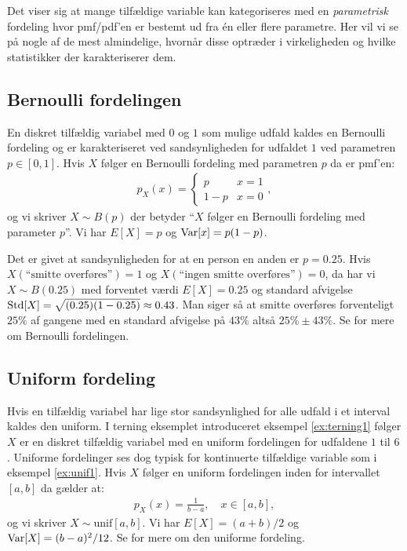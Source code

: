 Det viser sig at mange tilfældige variable kan kategoriseres med en \emph{parametrisk} fordeling hvor pmf/pdf'en er bestemt ud fra én eller flere parametre. Her vil vi se på nogle af de mest almindelige, hvornår disse optræder i virkeligheden og hvilke statistikker der karakteriserer dem. 
\subsection{Bernoulli fordelingen}
En diskret tilfældig variabel med $0$ og $1$ som mulige udfald kaldes en Bernoulli fordeling og er karakteriseret ved sandsynligheden for udfaldet $1$ ved parametren $p \in [0,1]$. Hvis $X$ følger en Bernoulli fordeling med parametren $p$ da er pmf'en:
\begin{align*}
p_X(x) = \begin{cases} p & x = 1 \\
1 - p & x = 0 
\end{cases},
\end{align*} 
og vi skriver $X \sim B(p)$ der betyder ``$X$ følger en Bernoulli fordeling med parameter $p$''. Vi har $E[X] = p$ og $\operatorname{Var}[x] = p(1-p)$. 
\begin{example}
Det er givet at sandsynligheden for at en person en anden er $p = 0.25$.  
Hvis  $X(\text{``smitte overføres''}) = 1$ og $X(\text{``ingen smitte overføres''}) = 0$, da har vi $X \sim B(0.25)$ med forventet værdi $E[X] = 0.25$ og standard afvigelse $\operatorname*{Std}[X] = \sqrt{(0.25)(1-0.25)} \approx 0.43$. Man siger så at smitte overføres forventeligt $25\%$ af gangene med en standard afvigelse på $43\%$ altså $25\% \pm 43\%$. Se \cite[111-112]{olofsson2012} for mere om Bernoulli fordelingen. 
\end{example}
\subsection{Uniform fordeling}
Hvis en tilfældig variabel har lige stor sandsynlighed for alle udfald i et interval kaldes den uniform. I terning eksemplet introduceret eksempel \ref{ex:terning1} følger $X$ er en diskret tilfældig variabel med en uniform fordelingen for udfaldene $1$ til $6$. Uniforme fordelinger ses dog typisk for kontinuerte tilfældige variable som i eksempel \ref{ex:unif1}. Hvis $X$ følger en uniform fordelingen inden for intervallet $[a,b]$ da gælder at:
\begin{align*}
p_X(x) = \frac{1}{b-a}, \quad x \in [a,b],
\end{align*}
og vi skriver $X \sim \text{unif}[a,b]$. Vi har $E[X] = (a+b)/2$ og $\operatorname{Var}[X] = (b-a)^2/12$. Se \cite[90-92]{olofsson2012} for mere om den uniforme fordeling. 
